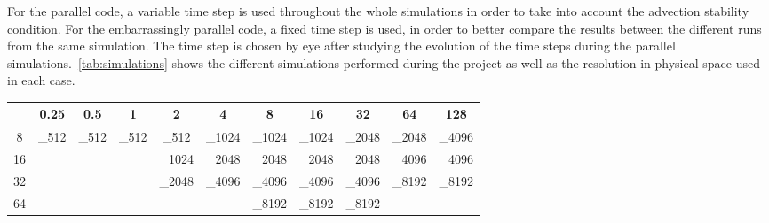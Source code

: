 \documentclass[../main.tex]{subfiles}
\begin{document}
For the parallel code, a variable time step is used throughout the whole simulations in order to take into account the advection stability condition. For the embarrassingly parallel code, a fixed time step is used, in order to better compare the results between the different runs from the same simulation. The time step is chosen by eye after studying the evolution of the time steps during the parallel simulations.~\cref{tab:simulations} shows the different simulations performed during the project as well as the resolution in physical space used in each case.
\begin{table}[ht]
	\centering
	\def\tickgreen{\textcolor{color_green3}{\ding{51}}}
	\def\tickblue{\textcolor{color_blue3}{\ding{51}}}
	\setlength{\tabcolsep}{5pt}
	\renewcommand{\arraystretch}{1.5}
	\begin{tabular}{c|cccccccccc}
		\diagbox[width=\dimexpr \textwidth/16+2\tabcolsep\relax, height=1cm]{$k_r$}{$\Re$} & 0.25             & 0.5              & 1                & 2                         & 4                          & 8                          & 16                         & 32                         & 64                & 128               \\\hline
		8                                                                                  & \tickgreen_{512} & \tickgreen_{512} & \tickgreen_{512} & \tickgreen\tickblue_{512} & \tickgreen\tickblue_{1024} & \tickgreen\tickblue_{1024} & \tickgreen\tickblue_{1024} & \tickgreen\tickblue_{2048} & \tickgreen_{2048} & \tickgreen_{4096} \\
		16                                                                                 &                  &                  &                  & \tickblue_{1024}          & \tickblue_{2048}           & \tickgreen\tickblue_{2048} & \tickgreen\tickblue_{2048} & \tickgreen\tickblue_{2048} & \tickgreen_{4096} & \tickgreen_{4096} \\
		32                                                                                 &                  &                  &                  & \tickblue_{2048}          & \tickblue_{4096}           & \tickgreen\tickblue_{4096} & \tickgreen\tickblue_{4096} & \tickgreen\tickblue_{4096} & \tickgreen_{8192} & \tickgreen_{8192} \\
		64                                                                                 &                  &                  &                  &                           &                            & \tickgreen_{8192}          & \tickgreen_{8192}          & \tickgreen_{8192}          &                   &                   \\

\end{tabular}
\end{table}
\end{document}
